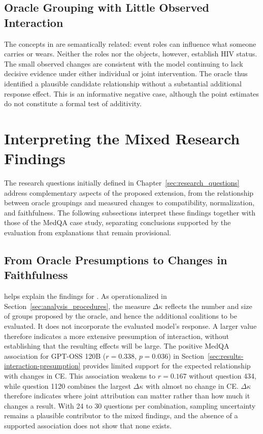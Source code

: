 \subsection{Oracle Grouping with Little Observed Interaction}

The concepts in  are semantically related: event roles can influence what someone carries or wears. Neither the roles nor the objects, however, establish HIV status. The small observed changes are consistent with the model continuing to lack decisive evidence under either individual or joint intervention. The oracle thus identified a plausible candidate relationship without a substantial additional response effect. This is an informative negative case, although the point estimates do not constitute a formal test of additivity.

\section{Interpreting the Mixed Research Findings}
\label{sec:mixed_research_findings}

The research questions initially defined in Chapter~\ref{sec:research_questions} address complementary aspects of the proposed extension, from the relationship between oracle groupings and measured changes to compatibility, normalization, and faithfulness. The following subsections interpret these findings together with those of the MedQA case study, separating conclusions supported by the evaluation from explanations that remain provisional.

\subsection{From Oracle Presumptions to Changes in Faithfulness}

 helps explain the findings for . As operationalized in Section~\ref{sec:analysis_procedures}, the measure $\Delta\kappa$ reflects the number and size of groups proposed by the oracle, and hence the additional coalitions to be evaluated. It does not incorporate the evaluated model's response. A larger value therefore indicates a more extensive presumption of interaction, without establishing that the resulting effects will be large. The positive MedQA association for GPT-OSS 120B ($r=0.338$, $p=0.036$) in Section~\ref{sec:results-interaction-presumption} provides limited support for the expected relationship with changes in CE. This association weakens to $r=0.167$ without question 434, while question 1120 combines the largest $\Delta\kappa$ with almost no change in CE. $\Delta\kappa$ therefore indicates where joint attribution can matter rather than how much it changes a result. With 24 to 30 questions per combination, sampling uncertainty remains a plausible contributor to the mixed findings, and the absence of a supported association does not show that none exists.


